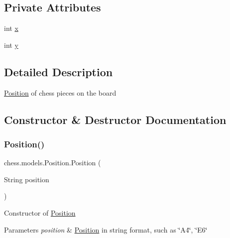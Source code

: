 \subsection*{Private Attributes}
\begin{DoxyCompactItemize}
\item 
int \mbox{\hyperlink{classchess_1_1models_1_1_position_a9b095a78776d58d10169eb9be3e6ff3e}{x}}
\item 
int \mbox{\hyperlink{classchess_1_1models_1_1_position_a9f261b4012bcedec786be011dee19fbf}{y}}
\end{DoxyCompactItemize}


\subsection{Detailed Description}
\mbox{\hyperlink{classchess_1_1models_1_1_position}{Position}} of chess pieces on the board 

\subsection{Constructor \& Destructor Documentation}
\mbox{\label{classchess_1_1models_1_1_position_af2ca0e2b74a18503f08e8492a52501c1}} 
\subsubsection{\texorpdfstring{Position()}{Position()}\hspace{0.1cm}{\footnotesize\ttfamily [1/2]}}
{\footnotesize\ttfamily chess.\+models.\+Position.\+Position (\begin{DoxyParamCaption}\item[{String}]{position }\end{DoxyParamCaption})}

Constructor of \mbox{\hyperlink{classchess_1_1models_1_1_position}{Position}}


\begin{DoxyParams}{Parameters}
{\em position} & \mbox{\hyperlink{classchess_1_1models_1_1_position}{Position}} in string format, such as \char`\"{}\+A4\char`\"{}, \char`\"{}\+E6\char`\"{} \\
\hline
\end{DoxyParams}
\mbox{\label{classchess_1_1models_1_1_position_aa5e15407a249f22ba683d43083c3f16b}} 
